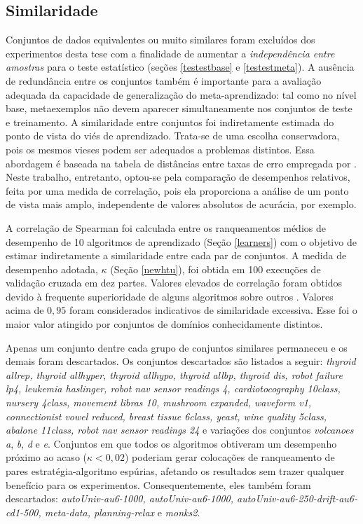 \subsection{Similaridade}\label{secsimi}
Conjuntos de dados equivalentes ou muito similares foram excluídos dos experimentos desta tese com a finalidade de aumentar a \textit{independência entre amostras} para o teste estatístico (seções \ref{testestbase} e \ref{testestmeta}).
A ausência de redundância entre os conjuntos também é importante para a avaliação adequada da capacidade de generalização do meta-aprendizado: tal como no nível base, metaexemplos não devem aparecer simultaneamente nos conjuntos de teste e treinamento.
A similaridade entre conjuntos foi indiretamente estimada do ponto de vista do viés de aprendizado.
Trata-se de uma escolha conservadora, pois os mesmos vieses podem ser adequados a problemas distintos.
Essa abordagem é baseada na tabela de distâncias entre taxas de erro empregada por .
Neste trabalho, entretanto, optou-se pela comparação de desempenhos relativos, feita por uma medida de correlação, pois ela proporciona a análise de um ponto de vista mais amplo, independente de valores absolutos de acurácia, por exemplo.

A correlação de Spearman \cite{reference/stat/GibbonsC11} foi calculada entre os ranqueamentos médios de desempenho de 10 algoritmos de aprendizado (Seção \ref{learners}) com o objetivo de estimar indiretamente a similaridade entre cada par de conjuntos.
A medida de desempenho adotada, $\kappa$ (Seção \ref{newhtu}), foi obtida em 100 execuções de validação cruzada em dez partes.
Valores elevados de correlação foram obtidos devido à frequente superioridade de alguns algoritmos sobre outros  \cite{journals/jmlr/DelgadoCBA14}.
Valores acima de $0,95$ foram considerados indicativos de similaridade excessiva.
Esse foi o maior valor atingido por conjuntos de domínios conhecidamente distintos.

Apenas um conjunto dentre cada grupo de conjuntos similares permaneceu e os demais foram descartados.
Os conjuntos descartados são listados a seguir:
\textit{thyroid allrep, thyroid allhyper, thyroid allhypo, thyroid allbp, thyroid dis, robot failure lp4, leukemia haslinger, robot nav sensor readings 4, cardiotocography 10class, nursery 4class, movement libras 10, mushroom expanded, waveform v1, connectionist vowel reduced, breast tissue 6class, yeast, wine quality 5class, abalone 11class, robot nav sensor readings 24} e variações dos conjuntos \textit{volcanoes} \textit{a}, \textit{b}, \textit{d} e \textit{e}.
Conjuntos em que todos os algoritmos obtiveram um desempenho próximo ao acaso ($\kappa < 0,02$) poderiam gerar colocações de ranqueamento de pares estratégia-algoritmo espúrias, afetando os resultados sem trazer qualquer benefício para os experimentos.
Consequentemente, eles também foram descartados: \textit{autoUniv-au6-1000, autoUniv-au6-1000, autoUniv-au6-250-drift-au6-cd1-500, meta-data, planning-relax} e \textit{monks2}.

